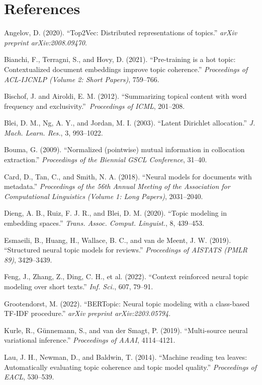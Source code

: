 \documentclass[Journal,letterpaper,NoLists]{ascelike-new}
\begin{document}
\section*{References}

Angelov, D. (2020). ``{Top2Vec}: Distributed representations of topics.'' \emph{arXiv preprint arXiv:2008.09470}.

Bianchi, F., Terragni, S., and Hovy, D. (2021). ``Pre-training is a hot topic: Contextualized document embeddings improve topic coherence.'' \emph{Proceedings of ACL-IJCNLP (Volume 2: Short Papers)}, 759--766.

Bischof, J. and Airoldi, E. M. (2012). ``Summarizing topical content with word frequency and exclusivity.''\ \emph{Proceedings of ICML}, 201--208.

Blei, D. M., Ng, A. Y., and Jordan, M. I. (2003). ``Latent {Dirichlet} allocation.'' \emph{J. Mach. Learn. Res.}, 3, 993--1022.

Bouma, G. (2009). ``Normalized (pointwise) mutual information in collocation extraction.'' \emph{Proceedings of the Biennial GSCL Conference}, 31--40.

Card, D., Tan, C., and Smith, N. A. (2018). ``Neural models for documents with metadata.'' \emph{Proceedings of the 56th Annual Meeting of the Association for Computational Linguistics (Volume 1: Long Papers)}, 2031--2040.

Dieng, A. B., Ruiz, F. J. R., and Blei, D. M. (2020). ``Topic modeling in embedding spaces.'' \emph{Trans. Assoc. Comput. Linguist.}, 8, 439--453.

Esmaeili, B., Huang, H., Wallace, B. C., and van de Meent, J. W. (2019). ``Structured neural topic models for reviews.'' \emph{Proceedings of AISTATS (PMLR 89)}, 3429--3439.

Feng, J., Zhang, Z., Ding, C. H., et al. (2022). ``Context reinforced neural topic modeling over short texts.'' {\em Inf. Sci.}, 607, 79--91.

Grootendorst, M. (2022). ``{BERTopic}: Neural topic modeling with a class-based {TF-IDF} procedure.'' \emph{arXiv preprint arXiv:2203.05794}.

Kurle, R., G\"unnemann, S., and van der Smagt, P. (2019). ``Multi-source neural variational inference.'' \emph{Proceedings of AAAI}, 4114--4121.

Lau, J. H., Newman, D., and Baldwin, T. (2014). ``Machine reading tea leaves: Automatically evaluating topic coherence and topic model quality.'' \emph{Proceedings of EACL}, 530--539.
\end{document}
